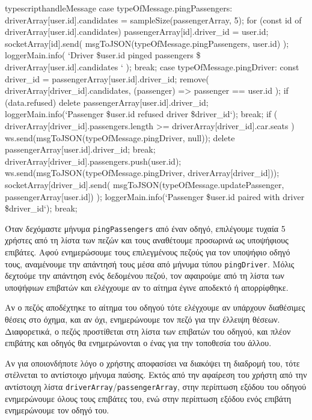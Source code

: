 \documentclass[../thesis.tex]{subfiles}
\begin{document}
\begin{codeblock}{typescript}{handleMessage}
  case typeOfMessage.pingPassengers: {
    driverArray[user.id].candidates = sampleSize(passengerArray, 5);
    for (const id of driverArray[user.id].candidates) {
      passengerArray[id].driver_id = user.id;
      socketArray[id].send(
        msgToJSON(typeOfMessage.pingPassengers, user.id)
      );
    }
    loggerMain.info(
      `Driver \${user.id} pinged passengers \${
        driverArray[user.id].candidates
      }`
    );
    break;
  }
  case typeOfMessage.pingDriver: {
    const driver_id = passengerArray[user.id].driver_id;
    remove(
      driverArray[driver_id].candidates,
      (passenger) => passenger == user.id
    );
    if (data.refused) {
      delete passengerArray[user.id].driver_id;
      loggerMain.info(`Passenger \${user.id} refused driver \${driver_id}`);
      break;
    }
    if (
      driverArray[driver_id].passengers.length >=
      driverArray[driver_id].car.seats
    ) {
      ws.send(msgToJSON(typeOfMessage.pingDriver, null));
      delete passengerArray[user.id].driver_id;
      break;
    }
    driverArray[driver_id].passengers.push(user.id);
    ws.send(msgToJSON(typeOfMessage.pingDriver, driverArray[driver_id]));
    socketArray[driver_id].send(
      msgToJSON(typeOfMessage.updatePassenger, passengerArray[user.id])
    );
    loggerMain.info(`Passenger \${user.id} paired with driver \${driver_id}`);
    break;
  }
\end{codeblock}

Όταν δεχόμαστε μήνυμα \texttt{pingPassengers} από έναν οδηγό, επιλέγουμε τυχαία 5 χρήστες από τη λίστα των πεζών και τους αναθέτουμε προσωρινά ως υποψήφιους επιβάτες.
Αφού ενημερώσουμε τους επιλεγμένους πεζούς για τον υποψήφιο οδηγό τους, αναμένουμε την απάντησή τους μέσα από μήνυμα τύπου \texttt{pingDriver}.
Μόλις δεχτούμε την απάντηση ενός δεδομένου πεζού, τον αφαιρούμε από τη λίστα των υποψήφιων επιβατών και ελέγχουμε αν το αίτημα έγινε αποδεκτό ή απορρίφθηκε.

Αν ο πεζός αποδέχτηκε το αίτημα του οδηγού τότε ελέγχουμε αν υπάρχουν διαθέσιμες θέσεις στο όχημα, και αν όχι, ενημερώνουμε τον πεζό για την έλλειψη θέσεων.
Διαφορετικά, ο πεζός προστίθεται στη λίστα των επιβατών του οδηγού, και πλέον επιβάτης και οδηγός θα ενημερώνονται ο ένας για την τοποθεσία του άλλου.

\bigskip

Αν για οποιονδήποτε λόγο ο χρήστης αποφασίσει να διακόψει τη διαδρομή του, τότε στέλνεται το αντίστοιχο μήνυμα παύσης.
Εκτός από την αφαίρεση του χρήστη από την αντίστοιχη λίστα \texttt{driverArray}/\texttt{passengerArray}, στην περίπτωση εξόδου του οδηγού ενημερώνουμε όλους τους επιβάτες του, ενώ στην περίπτωση εξόδου ενός επιβάτη ενημερώνουμε τον οδηγό του.
\end{document}

